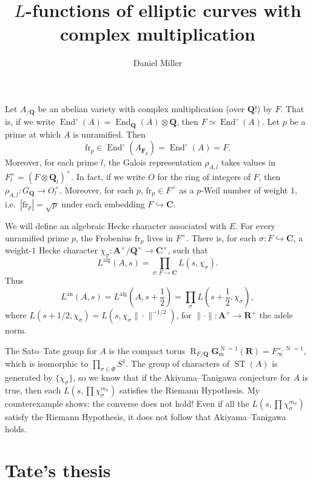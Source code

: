\documentclass{article}
\title{$L$-functions of elliptic curves with complex multiplication}
\author{Daniel Miller}
\DeclareMathOperator{\End}{End}
\DeclareMathOperator{\N}{N}
\DeclareMathOperator{\res}{R}
\DeclareMathOperator{\ST}{ST}
\newcommand{\bA}{\mathbf{A}}
\newcommand{\bC}{\mathbf{C}}
\newcommand{\bF}{\mathbf{F}}
\newcommand{\Gm}{\mathbf{G}_\mathrm{m}}
\newcommand{\bQ}{\mathbf{Q}}
\newcommand{\bR}{\mathbf{R}}
\newcommand{\alg}{\mathrm{alg}}
\newcommand{\an}{\mathrm{an}}
\newcommand{\frob}{\mathrm{fr}}
\begin{document}
\maketitle





Let $A_{/\bQ}$ be an abelian variety with complex multiplication (over $\bQ$!) 
by $F$. That is, if we write $\End^\circ(A) = \End_\bQ(A)\otimes\bQ$, then 
$F\simeq \End^\circ(A)$. Let $p$ be a prime at which $A$ is unramified. Then 
\[
	\frob_p \in \End^\circ(A_{\bF_p}) = \End^\circ(A) = F .
\]
Moreover, for each prime $l$, the Galois representation $\rho_{A,l}$ takes 
values in $F_l^\times = (F\otimes \bQ_l)^\times$. In fact, if we write $O$ 
for the ring of integers of $F$, then 
$\rho_{A,l}\colon G_\bQ \to O_l^\times$. Moreover, for each $p$, 
$\frob_p\in F^\times$ as a $p$-Weil number of weight $1$, 
i.e.~$|\frob_p| = \sqrt p$ under each embedding $F\hookrightarrow \bC$. 

We will define an algebraic Hecke character associated with $E$. For 
every unramified prime $p$, the Frobenius $\frob_p$ lives in $F^\times$. 
There is, for each $\sigma\colon F \hookrightarrow \bC$, a weight-$1$ Hecke 
character $\chi_\sigma\colon \bA^\times/\bQ^\times \to \bC^\times$, such 
that 
\[
	L^\alg(A,s) = \prod_{\sigma\colon F\hookrightarrow \bC} L(s,\chi_\sigma) .
\]
Thus 
\[
	L^\an(A,s) = L^\alg\left(A,s+\frac 1 2\right) = \prod_\sigma L\left(s+\frac 1 2,\chi_\sigma\right) ,
\]
where $L(s+1/2,\chi_\sigma) = L(s, \chi_\sigma \|\cdot\|^{-1/2})$, for 
$\|\cdot\|\colon \bA^\times \to \bR^+$ the adele norm. 

The Sato--Tate group for $A$ is the compact torus 
$\res_{F/\bQ}\Gm^{\N = 1}(\bR) = F_\infty^{\times, \N=1}$, which is isomorphic 
to $\prod_{\sigma \in \Phi} S^1$. The group of characters of $\ST(A)$ is 
generated by $\{\chi_\sigma\}$, so we know that if the Akiyama--Tanigawa 
conjecture for $A$ is true, then each $L(s,\prod \chi_\sigma^{m_\sigma})$ 
satisfies the Riemann Hypothesis. My counterexample shows: the converse does 
not hold! Even if all the $L(s,\prod \chi_\sigma^{m_\sigma})$ satisfy the 
Riemann Hypothesis, it does not follow that Akiyama--Tanigawa holds. 





\section{Tate's thesis}
\end{document}

